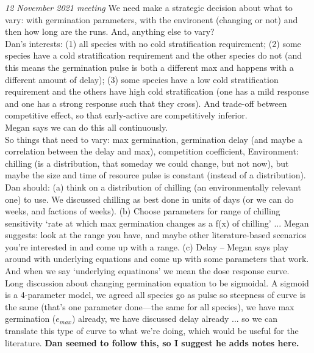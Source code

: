 \documentclass[11pt,letter]{article}
\begin{document}
\emph{12 November 2021 meeting} We need make a strategic decision about what to vary: with germination parameters, with the environent (changing or not) and then how long are the runs. And, anything else to vary?\\

Dan's interests: (1) all species with no cold stratification requirement; (2) some species have a cold stratification requirement and the other species do not (and this means the germination pulse is both a different max and happens with a different amount of delay); (3) some species have a low cold stratification requirement and the others have high cold stratification (one has a mild response and one has a strong response such that they cross).  And trade-off between competitive effect, so that early-active are competitively inferior. \\ 

Megan says we can do this all continuously.\\

So things that need to vary: max germination, germination delay (and maybe a correlation between the delay and max), competition coefficient, Environment: chilling (is a distribution, that someday we could change, but not now), but maybe the size and time of resource pulse is constant (instead of a distribution).\\

Dan should: (a) think on a distribution of chilling (an environmentally relevant one) to use. We discussed chilling as best done in units of days (or we can do weeks, and factions of weeks). (b) Choose parameters for range of chilling sensitivity `rate at which max germination changes as a f(x) of chilling' ... Megan suggests: look at the range you have, and maybe other literature-based scenarios you're interested in and come up with a range. (c) Delay -- Megan says play around with underlying equations and come up with some parameters that work. And when we say `underlying equatinons' we mean the dose response curve.\\

Long discussion about changing germination equation to be sigmoidal. A sigmoid is a 4-parameter model, we agreed all species go as pulse so steepness of curve is the same (that's one parameter done---the same for all species), we have max germination ($e_{max}$) already, we have discussed delay already ... so we can translate this type of curve to what we're doing, which would be useful for the literature. {\bf Dan seemed to follow this, so I suggest he adds notes here.}\\
\end{document}
